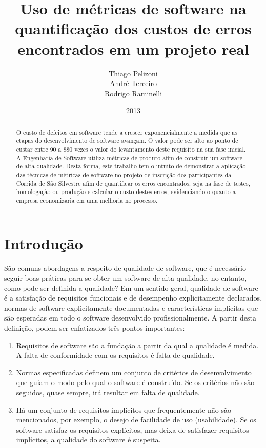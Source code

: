 \documentclass[11pt, a4paper]{article}
\title{Uso de métricas de software na quantificação dos custos de erros encontrados em um projeto real}
\author{
	Thiago Pelizoni \\
	André Terceiro \\
	Rodrigo Raminelli
}
\date{2013}
\begin{document}
\maketitle

\begin{abstract}
O custo de defeitos em software tende a crescer exponencialmente a medida que as etapas do desenvolvimento de software avançam. O valor pode ser alto ao ponto de custar entre 90 a 880 vezes o valor do levantamento deste requisito na sua fase inicial.\cite[p. 37]{NISL} A Engenharia de Software utiliza métricas de produto afim de construir um software de alta qualidade. Desta forma, este trabalho tem o intuito de demonstrar a aplicação das técnicas de métricas de software no projeto de inscrição dos participantes da Corrida de São Silvestre afim de quantificar os erros encontrados, seja na fase de testes, homologação ou produção e calcular o custo destes erros, evidenciando o quanto a empresa economizaria em uma melhoria no processo.


\end{abstract}


\section{Introdução}
São comuns abordagens a respeito de qualidade de software, que é necessário seguir boas práticas para se obter um software de alta qualidade, no entanto, como pode ser definida a qualidade? Em um sentido geral, qualidade de software é a satisfação de requisitos funcionais e de desempenho explicitamente declarados, normas de software explicitamente documentadas e características implícitas que são esperadas em todo o software desenvolvido profissionalmente. A partir desta definição, podem ser enfatizados três pontos importantes:

\begin{enumerate}
	\item Requisitos de software são a fundação a partir da qual a qualidade é medida. A falta de conformidade com os requisitos é falta de qualidade.
	\item Normas especificadas definem um conjunto de critérios de desenvolvimento que guiam o modo pelo qual o software é construído. Se os critérios não são seguidos, quase sempre, irá resultar em falta de qualidade.
	\item Há um conjunto de requisitos implícitos que frequentemente não são mencionados, por exemplo, o desejo de facilidade de uso (usabilidade). Se os software satisfaz os requisitos explícitos, mas deixa de satisfazer requisitos implícitos, a qualidade do software é suspeita.
\end{enumerate}
\cite[p.349]{pressman}
\end{document}
